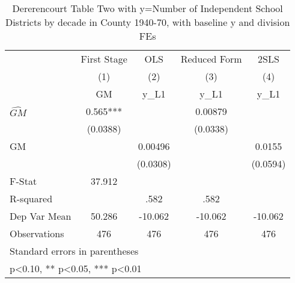 \begin{table}[htbp]\centering
\def\sym#1{\ifmmode^{#1}\else\(^{#1}\)\fi}
\caption{Dererencourt Table Two with y=Number of Independent School Districts by decade in County 1940-70, with baseline y and division FEs}
\begin{tabular}{l*{4}{c}}
\toprule
                    & First Stage   &         OLS   &Reduced Form   &        2SLS   \\
                    &\multicolumn{1}{c}{(1)}&\multicolumn{1}{c}{(2)}&\multicolumn{1}{c}{(3)}&\multicolumn{1}{c}{(4)}\\
                    &\multicolumn{1}{c}{GM}&\multicolumn{1}{c}{y\_L1}&\multicolumn{1}{c}{y\_L1}&\multicolumn{1}{c}{y\_L1}\\
\midrule
$\hat{GM}$          &       0.565***&               &     0.00879   &               \\
                    &    (0.0388)   &               &    (0.0338)   &               \\
\addlinespace
GM                  &               &     0.00496   &               &      0.0155   \\
                    &               &    (0.0308)   &               &    (0.0594)   \\
\midrule
F-Stat              &      37.912   &               &               &               \\
R-squared           &               &        .582   &        .582   &               \\
Dep Var Mean        &      50.286   &     -10.062   &     -10.062   &     -10.062   \\
Observations        &         476   &         476   &         476   &         476   \\
\bottomrule
\multicolumn{5}{l}{\footnotesize Standard errors in parentheses}\\
\multicolumn{5}{l}{\footnotesize * p<0.10, ** p<0.05, *** p<0.01}\\
\end{tabular}
\end{table}
